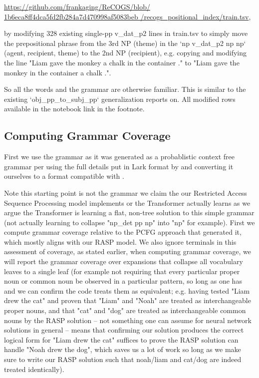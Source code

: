 \documentclass[11pt]{article}
\begin{document}
\href{https://github.com/frankaging/ReCOGS/blob/1b6eca8ff4dca5fd2fb284a7d470998af5083beb/recogs_positional_index/train.tsv}{https://github.com/frankaging/ReCOGS/blob/
1b6eca8ff4dca5fd2fb284a7d470998af5083beb
/recogs\_positional\_index/train.tsv},

by modifying 328 existing single-pp v\_dat\_p2 lines in train.tsv to simply move the prepositional phrase from the 3rd NP (theme) in the `np v\_dat\_p2 np np` (agent, recipient, theme) to the 2nd NP (recipient), e.g. copying and modifying the line "Liam gave the monkey a chalk in the container ." to "Liam gave the monkey in the container a chalk .".

So all the words and the grammar are otherwise familiar. This is similar to the existing `obj\_pp\_to\_subj\_pp` generalization \cite{Wu2023} reports on.
All modified rows available in the notebook link in the footnote.

\clearpage

\subsection{Computing Grammar Coverage}
\label{computing_grammar_coverage}

First we use the grammar as it was generated as a probablistic context free grammar per \cite{KimLinzen2020}
using the full details put in Lark format by \cite{klinger2024compositionalprogramgenerationfewshot}
and converting it ourselves to a format compatible with \cite{fuzzingbook2023:GrammarCoverageFuzzer}.

Note this starting point is not the grammar we claim the our Restricted Access Sequence Processing model implements or the Transformer actually learns as we argue the Transformer is learning a flat, non-tree solution to this simple grammar (not actually learning to collapse "np\_det pp np" into "np" for example). First we compute grammar coverage relative to the PCFG approach that generated it, which mostly aligns with our RASP model. We also ignore terminals in this assessment of coverage, as stated earlier, when computing grammar coverage, we will report the grammar coverage over expansions that collapse all vocabulary leaves to a single leaf (for example not requiring that every particular proper noun or common noun be observed in a particular pattern, so long as one has and we can confirm the code treats them as equivalent; e.g. having tested "Liam drew the cat" and proven that "Liam" and "Noah" are treated as interchangeable proper nouns, and that "cat" and "dog" are treated as interchangeable common nouns by the RASP solution -- not something one can assume for neural network solutions in general -- means that confirming our solution produces the correct logical form for "Liam drew the cat" suffices to prove the RASP solution can handle "Noah drew the dog", which saves us a lot of work so long as we make sure to write our RASP solution such that noah/liam and cat/dog are indeed treated identically).
\end{document}
